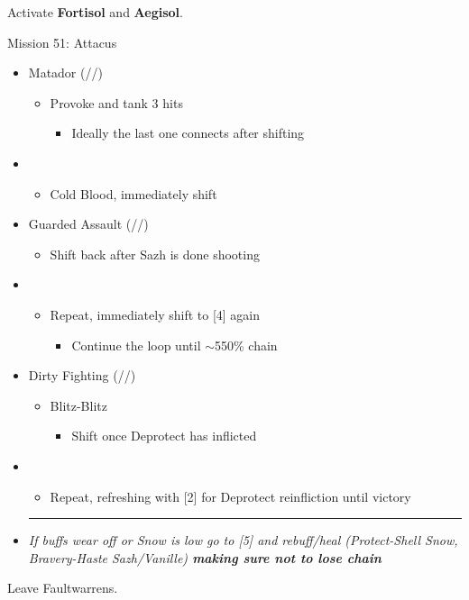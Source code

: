 \renewcommand{\second}{[2] Dirty Fighting (\com/\sen/\sab)}
\renewcommand{\fourth}{[4] Guarded Assault (\sen/\sen/\com)}
\renewcommand{\fifth}{[5] Protection (\syn/\sen/\med)}
\renewcommand{\sixth}{[6] Matador (\sen/\rav/\sab)}

Activate \textbf{Fortisol} and \textbf{Aegisol}.

\begin{battle}{Mission 51: Attacus}
	\begin{itemize}
		\item \sixth
			\begin{itemize}
				\item Provoke and tank 3 hits
					\begin{itemize}
						\item Ideally the last one connects after shifting
					\end{itemize}
			\end{itemize}
		\item \third
			\begin{itemize}
				\item Cold Blood, immediately shift
			\end{itemize}
		\item \fourth
			\begin{itemize}
				\item Shift back after Sazh is done shooting
			\end{itemize}
		\item \third
			\begin{itemize}
				\item Repeat, immediately shift to [4] again
					\begin{itemize}
						\item Continue the loop until $\sim$550\% chain
					\end{itemize}
			\end{itemize}
		\item \second
			\begin{itemize}
				\item Blitz-Blitz
					\begin{itemize}
						\item Shift once Deprotect has inflicted
					\end{itemize}
			\end{itemize}
		\item \first
			\begin{itemize}
				\item Repeat, refreshing with [2] for Deprotect reinfliction until victory
			\end{itemize}
		\rule{.9\columnwidth}{1pt}
		\item \textit{ If buffs wear off or Snow is low go to [5] and rebuff/heal (Protect-Shell Snow, Bravery-Haste Sazh/Vanille) \textbf{making sure not to lose chain}}
	\end{itemize}
\end{battle}

Leave Faultwarrens.
